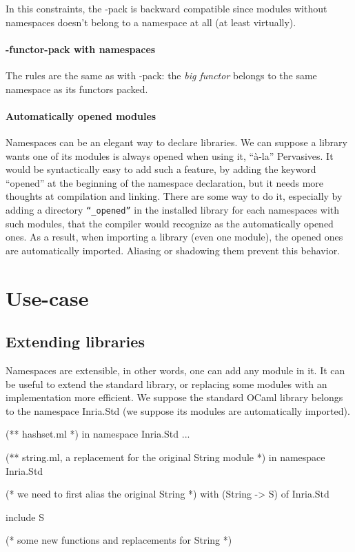 \documentclass[11pt,a4paper]{article}
\begin{document}
In this constraints, the -pack is backward compatible since modules without
namespaces doesn't belong to a namespace at all (at least virtually).

\paragraph{-functor-pack with namespaces}

The rules are the same as with -pack: the \emph{big functor} belongs to the same
namespace as its functors packed.

\paragraph{Automatically opened modules}

Namespaces can be an elegant way to declare libraries. We can suppose a library
wants one of its modules is always opened when using it, ``à-la'' Pervasives. It
would be syntactically easy to add such a feature, by adding the keyword
``opened'' at the beginning of the namespace declaration, but it needs more
thoughts at compilation and linking. There are some way to do it, especially by
adding a directory \texttt{``\_opened''} in the installed library for each
namespaces with such modules, that the compiler would recognize as the
automatically opened ones. As a result, when importing a library (even one
module), the opened ones are automatically imported. Aliasing or shadowing
them prevent this behavior.

\section{Use-case}

\subsection{Extending libraries}

Namespaces are extensible, in other words, one can add any module in it. It can
be useful to extend the standard library, or replacing some modules with an
implementation more efficient. We suppose the standard OCaml library belongs to
the namespace Inria.Std (we suppose its modules are automatically
imported).

\begin{OCaml}
(** hashset.ml *)
in namespace Inria.Std
...
\end{OCaml}

\begin{OCaml}
(** string.ml, a replacement for the original String module *)
in namespace Inria.Std

(* we need to first alias the original String *)
  with (String -> S) of Inria.Std

include S

(* some new functions and replacements for String *)
\end{OCaml}
\end{document}
